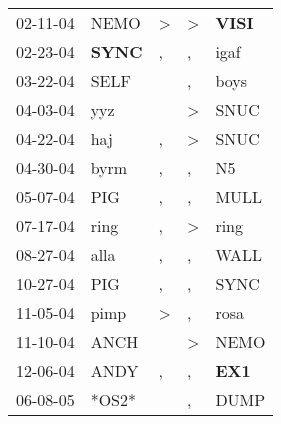 \begin{supertabular}{p{0.07\textwidth}p{0.06\textwidth}p{0.02\textwidth}p{0.02\textwidth}p{0.06\textwidth}}
          02-11-04\textsuperscript{} &           NEMO\textsuperscript{} &     \textgreater &     \textgreater &  \textbf{VISI\textsuperscript{}} \\
          02-23-04\textsuperscript{} &  \textbf{SYNC\textsuperscript{}} &                , &                , &           igaf\textsuperscript{} \\
          03-22-04\textsuperscript{} &           SELF\textsuperscript{} &                  &                , &           boys\textsuperscript{} \\
          04-03-04\textsuperscript{} &            yyz\textsuperscript{} &                  &     \textgreater &           SNUC\textsuperscript{} \\
          04-22-04\textsuperscript{} &            haj\textsuperscript{} &                , &     \textgreater &           SNUC\textsuperscript{} \\
          04-30-04\textsuperscript{} &           byrm\textsuperscript{} &                , &                , &             N5\textsuperscript{} \\
          05-07-04\textsuperscript{} &            PIG\textsuperscript{} &                , &                , &           MULL\textsuperscript{} \\
          07-17-04\textsuperscript{} &           ring\textsuperscript{} &                , &     \textgreater &           ring\textsuperscript{} \\
          08-27-04\textsuperscript{} &           alla\textsuperscript{} &                , &                , &           WALL\textsuperscript{} \\
          10-27-04\textsuperscript{} &            PIG\textsuperscript{} &                , &                , &           SYNC\textsuperscript{} \\
          11-05-04\textsuperscript{} &           pimp\textsuperscript{} &     \textgreater &                , &           rosa\textsuperscript{} \\
          11-10-04\textsuperscript{} &           ANCH\textsuperscript{} &                  &     \textgreater &           NEMO\textsuperscript{} \\
          12-06-04\textsuperscript{} &           ANDY\textsuperscript{} &                , &                , &   \textbf{EX1\textsuperscript{}} \\
          06-08-05\textsuperscript{} &                            *OS2* &                  &                , &           DUMP\textsuperscript{} \\

\end{supertabular}
